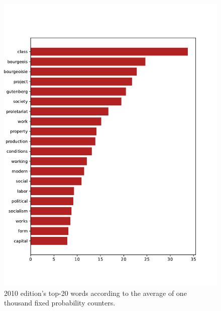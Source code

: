 \begin{figure}[!ht]
    \centering
    \includegraphics[width=0.9\linewidth]{figs/2010.epub-fixed-1000}
    \caption{2010 edition's top-20 words according to the average of one thousand fixed probability counters.}
    \label{fig:2010-20-fixed}
\end{figure}


